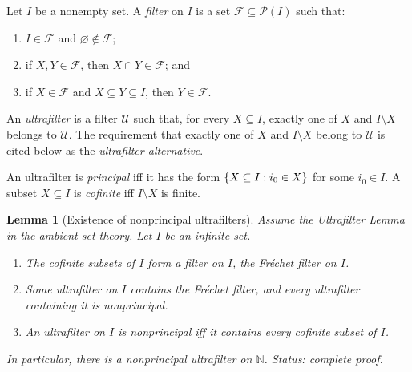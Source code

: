 \documentclass[11pt,oneside,openany]{book}
\theoremstyle{definition}
\newtheorem{definition}{Definition}[chapter]
\theoremstyle{plain}
\newtheorem{lemma}[definition]{Lemma}
\theoremstyle{remark}
\let\LogicDefinition\definition
\let\endLogicDefinition\enddefinition
\renewenvironment{definition}[1][]{%
  \LogicDefinition[#1]%
  \if\relax\detokenize{#1}\relax\else\index{#1}\fi
}{\endLogicDefinition}
\DeclarePairedDelimiter{\set}{\lbrace}{\rbrace}
\newcommand{\N}{\mathbb{N}}
\newcommand{\Pow}{\mathcal{P}}
\begin{document}
\begin{definition}[Filter]
Let \(I\) be a nonempty set.  A \emph{filter} on \(I\) is a set
\(\mathcal F\subseteq\Pow(I)\) such that:
\begin{enumerate}
  \item \(I\in\mathcal F\) and \(\varnothing\notin\mathcal F\);
  \item if \(X,Y\in\mathcal F\), then \(X\cap Y\in\mathcal F\); and
  \item if \(X\in\mathcal F\) and \(X\subseteq Y\subseteq I\), then
        \(Y\in\mathcal F\).
\end{enumerate}
An \emph{ultrafilter} is a filter \(\mathcal U\) such that, for every
\(X\subseteq I\), exactly one of \(X\) and \(I\setminus X\) belongs to
\(\mathcal U\).  The requirement that exactly one of \(X\) and
\(I\setminus X\) belong to \(\mathcal U\) is cited below as the
\emph{ultrafilter alternative}.
\end{definition}

An ultrafilter is \emph{principal} iff it has the form
\(\set{X\subseteq I:i_0\in X}\) for some \(i_0\in I\).  A subset
\(X\subseteq I\) is \emph{cofinite} iff \(I\setminus X\) is finite.

\begin{lemma}[Existence of nonprincipal ultrafilters]
\label{lem:nonprincipal-ultrafilter}
Assume the Ultrafilter Lemma in the ambient set theory.  Let \(I\) be an
infinite set.
\begin{enumerate}
  \item The cofinite subsets of \(I\) form a filter on \(I\), the
        \emph{Fr\'echet filter} on \(I\).
  \item Some ultrafilter on \(I\) contains the Fr\'echet filter, and every
        ultrafilter containing it is nonprincipal.
  \item An ultrafilter on \(I\) is nonprincipal iff it contains every
        cofinite subset of \(I\).
\end{enumerate}
In particular, there is a nonprincipal ultrafilter on \(\N\).
\textit{Status: complete proof.}
\end{lemma}
\end{document}
